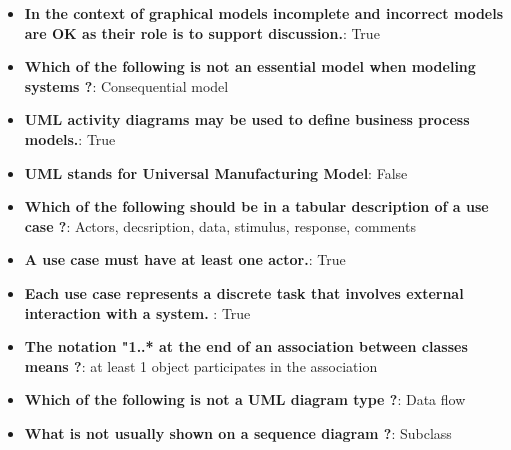 \documentclass{report}
\begin{document}
    \pagebreak 
    \begin{itemize}
        \item \textbf{In the context of graphical models incomplete and incorrect models are OK as their role is to support discussion.}: True
        \item \textbf{Which of the following is not an essential model when modeling systems ?}: Consequential model
        \item \textbf{UML activity diagrams may be used to define business process models.}: True
        \item \textbf{UML stands for Universal Manufacturing Model}: False
        \item \textbf{Which of the following should be in a tabular description of a use case ?}: Actors, decsription, data, stimulus, response, comments
        \item \textbf{A use case must have at least one actor.}: True
        \item \textbf{Each use case represents a discrete task that involves external interaction with a system. }: True
        \item \textbf{The notation "1..* at the end of an association between classes means ?}: at least 1 object participates in the association
        \item \textbf{Which of the following is not a UML diagram type ?}: Data flow
        \item \textbf{What is not usually shown on a sequence diagram ?}: Subclass
    \end{itemize}
    
\end{document}
